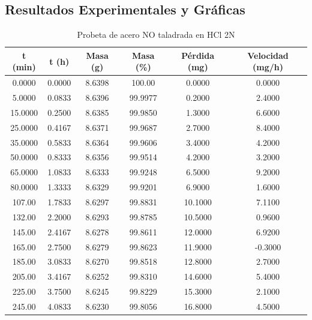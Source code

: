 \documentclass[11pt,a4paper]{article}
\begin{document}
\subsection{Resultados Experimentales y Gráficas}
\begin{table}[H]
\centering
\caption{Probeta de acero NO taladrada en $\text{HCl}$ 2N}
\label{tab:3_2_no_tal}
\begin{tabular}{cccccc}
\toprule
t (min) & t (h) & Masa (g) & Masa (\%) & Pérdida (mg) & Velocidad (mg/h) \\
\midrule
0.0000 & 0.0000 & 8.6398 & 100.00 & 0.0000 & 0.0000 \\
5.0000 & 0.0833 & 8.6396 & 99.9977 & 0.2000 & 2.4000 \\
15.0000 & 0.2500 & 8.6385 & 99.9850 & 1.3000 & 6.6000 \\
25.0000 & 0.4167 & 8.6371 & 99.9687 & 2.7000 & 8.4000 \\
35.0000 & 0.5833 & 8.6364 & 99.9606 & 3.4000 & 4.2000 \\
50.0000 & 0.8333 & 8.6356 & 99.9514 & 4.2000 & 3.2000 \\
65.0000 & 1.0833 & 8.6333 & 99.9248 & 6.5000 & 9.2000 \\
80.0000 & 1.3333 & 8.6329 & 99.9201 & 6.9000 & 1.6000 \\
107.00 & 1.7833 & 8.6297 & 99.8831 & 10.1000 & 7.1100 \\
132.00 & 2.2000 & 8.6293 & 99.8785 & 10.5000 & 0.9600 \\
145.00 & 2.4167 & 8.6278 & 99.8611 & 12.0000 & 6.9200 \\
165.00 & 2.7500 & 8.6279 & 99.8623 & 11.9000 & -0.3000 \\
185.00 & 3.0833 & 8.6270 & 99.8518 & 12.8000 & 2.7000 \\
205.00 & 3.4167 & 8.6252 & 99.8310 & 14.6000 & 5.4000 \\
225.00 & 3.7500 & 8.6245 & 99.8229 & 15.3000 & 2.1000 \\
245.00 & 4.0833 & 8.6230 & 99.8056 & 16.8000 & 4.5000 \\
\bottomrule
\end{tabular}
\end{table}
\end{document}
